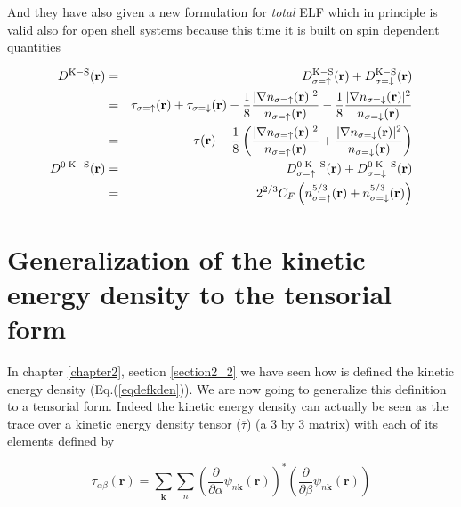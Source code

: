 \documentclass[a4paper,12pt]{report}
\begin{document}
And they have also given a new formulation for \textit{total} ELF which in principle is valid also for open shell systems because this time it is built on spin dependent quantities

\begin{eqnarray}
D^{\rm{K-S}}(\mathbf{r}) &=& D_{\sigma=\uparrow}^{\rm{K-S}}(\mathbf{r}) + D_{\sigma=\downarrow}^{\rm{K-S}}(\mathbf{r}) \nonumber\\
                         &=& \tau_{\sigma=\uparrow}(\mathbf{r}) + \tau_{\sigma=\downarrow}(\mathbf{r}) - \frac{1}{8} \frac{\vert \nabla n_{\sigma=\uparrow}(\mathbf{r}) \vert^2}{n_{\sigma=\uparrow}(\mathbf{r})} - \frac{1}{8} \frac{\vert \nabla n_{\sigma=\downarrow}(\mathbf{r}) \vert^2}{n_{\sigma=\downarrow}(\mathbf{r})} \nonumber\\
                         &=& \tau(\mathbf{r}) - \frac{1}{8} \left( \frac{\vert \nabla n_{\sigma=\uparrow}(\mathbf{r}) \vert^2}{n_{\sigma=\uparrow}(\mathbf{r})} + \frac{\vert \nabla n_{\sigma=\downarrow}(\mathbf{r}) \vert^2}{n_{\sigma=\downarrow}(\mathbf{r})} \right) \\
D^{0\;\rm{K-S}}(\mathbf{r}) &=& D_{\sigma=\uparrow}^{0\;\rm{K-S}}(\mathbf{r}) + D_{\sigma=\downarrow}^{0\;\rm{K-S}}(\mathbf{r}) \nonumber\\
                            &=& 2^{2/3} C_F \left( n_{\sigma=\uparrow}^{5/3}(\mathbf{r}) + n_{\sigma=\downarrow}^{5/3}(\mathbf{r}) \right)
\end{eqnarray}


\chapter{Generalization of the kinetic energy density to the tensorial form}
\label{chapter4}

In chapter \ref{chapter2}, section \ref{section2_2} we have seen how is defined the kinetic energy density (Eq.(\ref{eqdefkden})). We are now going to generalize this definition to a tensorial form. Indeed the kinetic energy density can actually be seen as the trace over a kinetic energy density tensor ($\overline{\tau}$) (a $3$ by $3$ matrix) with each of its elements defined by

\begin{equation}
\tau_{\alpha\beta}(\mathbf{r}) = \sum_{\mathbf{k}} \sum_n \left( \frac{\partial}{\partial \alpha} \psi_{n\mathbf{k}}(\mathbf{r}) \right)^{*} \left( \frac{\partial}{\partial \beta} \psi_{n\mathbf{k}}(\mathbf{r}) \right)
\end{equation}
\end{document}
